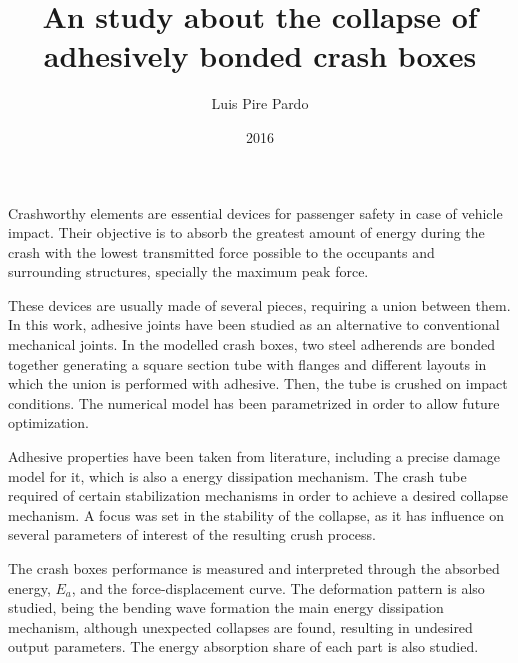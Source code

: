 \documentclass[
documentsize = a4, %
font = cmr, %
typesize = 11, %
printmode = true,
onehalfspacing = true,
language = en, %
titlepage = udciccp, %
degree = pt, %
dedication = true,
acknowledgements = true,
abstract-en = true,
abstract-es = false,
abstract-ga = false,
epigraphs = true,
toc = true,
lof = true,
lot = true,
frontmatterintoc = false,
notation = false,
minimal = false,
]{UDCthesis}
\title{An study about the collapse of adhesively bonded crash boxes}
\author{Luis Pire Pardo}
\date{2016}
\begin{document}

\begin{abstracten}
Crashworthy elements are essential devices for passenger safety in case of vehicle impact. Their objective is to absorb the greatest amount of energy during the crash with the lowest transmitted force possible to the occupants and surrounding structures, specially the maximum peak force.

These devices are usually made of several pieces, requiring a union between them. In this work, adhesive joints have been studied as an alternative to conventional mechanical joints. In the modelled crash boxes, two steel adherends are bonded together generating a square section tube with flanges and different layouts in which the union is performed with adhesive. Then, the tube is crushed on impact conditions. The numerical model has been parametrized in order to allow future optimization.

Adhesive properties have been taken from literature, including a precise damage model for it, which is also a energy dissipation mechanism. The crash tube required of certain stabilization mechanisms in order to achieve a desired collapse mechanism. A focus was set in the stability of the collapse, as it has influence on several parameters of interest of the resulting crush process.

The crash boxes performance is measured and interpreted through the absorbed energy, $E_{a}$, and the force-displacement curve. The deformation pattern is also studied, being the bending wave formation the main energy dissipation mechanism, although unexpected collapses are found, resulting in undesired output parameters. The energy absorption share of each part is also studied.
\end{abstracten}
\end{document}
